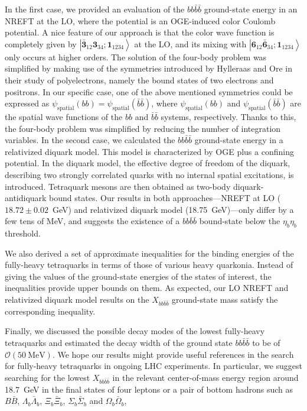 \documentclass[twocolumn,showpacs,superscriptaddress,preprintnumbers,nofootinbib,prd]{revtex4-1}
\newcommand{\blue}[1]{{\color{blue}#1}}
\begin{document}
In the first case, we provided an evaluation of the $b b \bar b \bar b$
ground-state energy in an NREFT at the LO, where the potential is an OGE-induced color Coulomb potential.
A nice feature of our approach is that the color wave function is completely given by $\left| \bar{\textbf{3}}_{12}\textbf{3}_{34};
\textbf{1}_{1234} \right\rangle$ at the LO, and its mixing with $\left| \textbf{6}_{12}\bar{\textbf{6}}_{34};
\textbf{1}_{1234} \right\rangle$ only occurs at higher orders.
The solution of the four-body problem was simplified by making use of the
symmetries introduced by Hylleraas and Ore in their study of polyelectrons,
namely the bound states of two electrons and positrons.
In our specific case, one of the above mentioned symmetries could be expressed as
$\psi_{\textrm{spatial}}(bb)=\psi_{\textrm{spatial}}(\bar b \bar b)$, where
$\psi_{\textrm{spatial}}(bb)$ and $\psi_{\textrm{spatial}}(\bar b \bar b)$ are
the spatial wave functions of the $bb$ and $\bar b \bar b$ systems,
respectively.
Thanks to this, the four-body problem was simplified by reducing the number
of integration variables. In the second case, we calculated the $b b \bar b \bar b$
ground-state energy in a relativized diquark model. This model is characterized by
OGE plus a confining potential. In the diquark model, the effective degree of
freedom of the diquark, describing two strongly correlated quarks with no
internal spatial excitations, is introduced. Tetraquark mesons are then
obtained as two-body diquark-antidiquark bound states.
Our results in both approaches---NREFT at LO ($18.72\pm0.02$~GeV) and relativized diquark model (18.75~GeV)---only differ by a few tens of MeV, and suggests the existence of a $b b \bar b \bar b$ bound-state below the $\eta_b\eta_b$ threshold.

We also derived a set of approximate inequalities for the binding energies of the
fully-heavy tetraquarks in terms of those of various heavy quarkonia.
Instead of giving the values of the ground-state energies of the
states of interest, the inequalities provide upper bounds on them.
As expected, our LO NREFT and relativized diquark model results on the $X_{bb\bar{b}\bar{b}}$ ground-state mass satisfy the corresponding inequality.

Finally, we discussed the possible decay modes of the lowest fully-heavy
tetraquarks and estimated the decay width of the ground state
$bb\bar b\bar b$ to be of $\mathcal{O}(50~\text{MeV})$.
We hope our results might provide useful references in the
search for fully-heavy tetraquarks in ongoing LHC experiments.
In particular, we suggest searching for the  lowest $X_{bb\bar{b}\bar{b}}$
in the relevant center-of-mass energy region around 18.7~GeV in the
final states of four leptons or a pair of bottom hadrons  such as $B\bar B$,
$\Lambda_b\bar \Lambda_b$, $\Xi_b\bar \Xi_b$, $\Sigma_b\bar \Sigma_b$ and
$\Omega_b\bar \Omega_b$, \blue{  }
\end{document}
